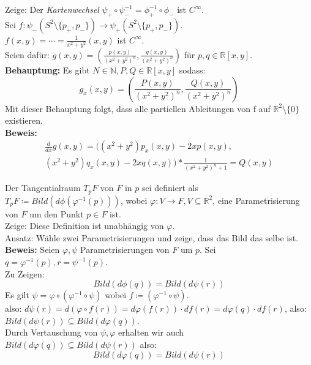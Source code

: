 \begin{problem*}[1b]
Zeige: Der \emph{Kartenwechsel} $\psi_+ \circ \psi_-^{ -1 } = \phi_+^{ -1 } \circ \phi_-$ ist $ C^{ \infty  } $.\\
Sei $f: \psi_- (S^{ 2 } \setminus \{ p_+, p_- \}) \to \psi_+(S^{ 2 } \setminus \{ p_+, p_- \})$.\\
$f(x,y) = \cdots = \frac{1}{x^2 + y^2}(x,y)$ ist $C^{ \infty  } $.\\
Seien dafür: $g(x,y) = ( \frac{p(x,y)}{(x^2 + y^2)^n}, \frac{q(x,y)}{(x^2 + y^2)^n})$ für $p,q \in \mathbb{R}[x,y]$.\\
\textbf{Behauptung:} Es gibt $N \in \mathbb{N}, P, Q \in \mathbb{R}[x,y]$ sodass:
\begin{equation*}
  g_x(x,y) = \left( \frac{P(x,y)}{(x^2 + y^2)^n}, \frac{Q(x,y)}{(x^2 + y^2)^n}\right)
\end{equation*}
Mit dieser Behauptung folgt, dass alle partiellen Ableitungen von f auf $ \mathbb{R}^2 \setminus \{ 0 \} $ existieren.\\
\textbf{Beweis:}
\begin{align*}
  \frac{d}{dx} g(x,y) = ((x^2 + y^2) p_x(x,y) - 2x p(x,y), \\
   (x^2 + y^2) q_x(x,y) - 2x q(x,y))
   * \frac{1}{(x^2 + y^2)^n+1} = Q(x,y)
\end{align*}
\end{problem*}
\begin{problem*}[2a]
Der Tangentialraum $ T_pF$ von $ F $ in $ p $ sei definiert als $ T_pF \coloneqq Bild(d \phi (\varphi^{ -1 }(p))) $, wobei $\varphi: V \to F, V \subseteq \mathbb{ R }^2$, eine Parametrisierung von $ F $ um den Punkt $ p \in F$ ist.\\
Zeige: Diese Definition ist unabhängig von $\varphi$.\\
Ansatz: Wähle zwei Parametrisierungen und zeige, dass das Bild das selbe ist.\\
\textbf{Beweis:} Seien $ \varphi, \psi$ Parametrisierungen von $ F $ um $ p $. Sei $q=\varphi^{ -1 }(p), r=\psi^{ -1 }(p).$\\
Zu Zeigen:
\begin{equation*}
Bild(d \phi(q)) = Bild(d \psi(r))
\end{equation*}
Es gilt $\psi = \varphi \circ (\varphi^{ -1 }\circ \psi)$ wobei $f \coloneqq (\varphi^{ -1 }\circ \psi)$.\\
also: $d \psi(r) = d (\varphi \circ f(r)) = d \varphi(f(r)) \cdot df(r) = d \varphi(q) \cdot df(r)$, also:\\
$Bild(d \psi(r)) \subseteq Bild(d\varphi(q))$.\\
Durch Vertauschung von $ \psi ,\varphi $ erhalten wir auch $Bild(d\varphi(q)) \subseteq Bild(d \psi(r))$ also: 
\begin{equation*}
  Bild(d\varphi(q)) = Bild(d \psi(r))
\end{equation*}
\end{problem*}

